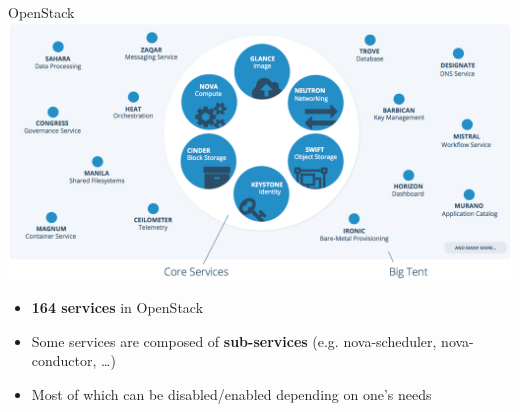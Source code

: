 \documentclass[10pt]{beamer}
\begin{document}
\begin{frame}{OpenStack}
  	\centering\includegraphics[width=.8\paperwidth]{figs/os_big-tent.png}
  \begin{itemize}
	 \item \textbf{164 services} in OpenStack
	 \item Some services are composed of \textbf{sub-services} (e.g. nova-scheduler,
		nova-conductor, \dots)
	 \item Most of which can be disabled/enabled depending on one's needs
  \end{itemize}
\end{frame}
\end{document}
